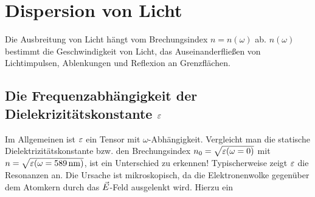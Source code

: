 
\chapter{Dispersion von Licht}

Die Ausbreitung von Licht hängt vom Brechungsindex $n=n(\omega)$
ab. $n(\omega)$ bestimmt die Geschwindigkeit von Licht, das
Auseinanderfließen von Lichtimpulsen, Ablenkungen und Reflexion an
Grenzflächen. 

\section{Die Frequenzabhängigkeit der Dielekrizitätskonstante $\varepsilon$}
Im Allgemeinen ist $\varepsilon$ ein Tensor mit $\omega$-Abhängigkeit. 
Vergleicht man die statische Dielektrizitätskonstante bzw. den
Brechungsindex $n_0=\sqrt{\varepsilon(\omega=0)}$ mit 
$n=\sqrt{\varepsilon(\omega=\SI{589}{\nano\meter})}$, ist ein Unterschied zu
erkennen! Typischerweise zeigt $\varepsilon$ die Resonanzen an. Die Ursache
ist mikroskopisch, da die Elektronenwolke gegenüber dem Atomkern durch
das $\vec{E}$-Feld ausgelenkt wird. Hierzu ein

